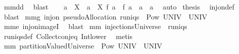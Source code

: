 \begin{isabellebody}
\ mm{}{}dd\ \isamarkupfalse%
\ blast\ \isamarkupfalse%
\ \isanewline
{}\isamarkupfalse%
\ {\isachardoublequoteopen}{\isasymforall}a{}\ {\isasymin}\ {\isacharquery}X{\isachardot}\ {\isasymforall}\ a{}\ {\isasymin}\ {\isacharquery}X{\isachardot}\ {\isacharquery}f\ a{}\ {\isacharequal}\ {\isacharquery}f\ a{}\ {\isasymlongrightarrow}\ a{}\ {\isacharequal}\ a{}{\isachardoublequoteclose}\ \isamarkupfalse%
\ auto\isanewline
{}\isamarkupfalse%
\ {\isacharquery}thesis\ \isamarkupfalse%
\ inj{\isacharunderscore}on{\isacharunderscore}def\ \isamarkupfalse%
\ blast\isanewline
{}\isamarkupfalse%
%
\endisatagproof
{\isafoldproof}%
%
\isadelimproof
\isanewline
%
\endisadelimproof
\isanewline
{}\isamarkupfalse%
\ mm{}{}g{\isacharcolon}\ {\isachardoublequoteopen}inj{\isacharunderscore}on\ pseudoAllocation\ {\isacharparenleft}runiqs\ {\isasyminter}\ Pow\ {\isacharparenleft}UNIV\ {\isasymtimes}\ {\isacharparenleft}UNIV\ {\isacharminus}\ {\isacharbraceleft}{\isacharbraceleft}{\isacharbraceright}{\isacharbraceright}{\isacharparenright}{\isacharparenright}{\isacharparenright}{\isachardoublequoteclose}\ \isanewline
%
\isadelimproof
%
\endisadelimproof
%
\isatagproof
{}\isamarkupfalse%
\ mm{}{}e\ inj{\isacharunderscore}on{\isacharunderscore}imageI{}\ \isamarkupfalse%
\ blast%
\endisatagproof
{\isafoldproof}%
%
\isadelimproof
\isanewline
%
\endisadelimproof
{}\isamarkupfalse%
\ mm{}{}{\isacharcolon}\ {\isachardoublequoteopen}injectionsUniverse\ {\isasymsubseteq}\ runiqs{\isachardoublequoteclose}%
\isadelimproof
\ %
\endisadelimproof
%
\isatagproof
{}\isamarkupfalse%
\ runiqs{\isacharunderscore}def\ Collect{\isacharunderscore}conj{\isacharunderscore}eq\ Int{\isacharunderscore}lower{}\ \isamarkupfalse%
\ metis%
\endisatagproof
{\isafoldproof}%
%
\isadelimproof
%
\endisadelimproof
\isanewline
{}\isamarkupfalse%
\ mm{}{}{\isacharcolon}\ {\isachardoublequoteopen}partitionValuedUniverse\ {\isasymsubseteq}\ Pow\ {\isacharparenleft}UNIV\ {\isasymtimes}\ {\isacharparenleft}UNIV\ {\isacharminus}\ {\isacharbraceleft}{\isacharbraceleft}{\isacharbraceright}{\isacharbraceright}{\isacharparenright}{\isacharparenright}{\isachardoublequoteclose}%

\end{isabellebody}
